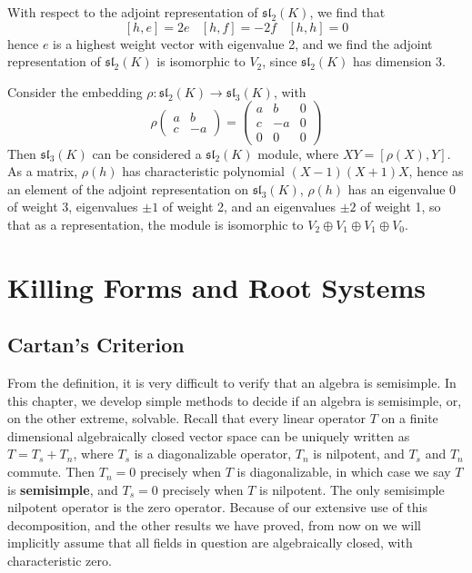 \begin{example}
    With respect to the adjoint representation of $\mathfrak{sl}_2(K)$, we find that
    \[ [h,e] = 2e\ \ \ \ [h,f] = -2f\ \ \ \ [h,h] = 0 \]
    hence $e$ is a highest weight vector with eigenvalue 2, and we find the adjoint representation of $\mathfrak{sl}_2(K)$ is isomorphic to $V_2$, since $\mathfrak{sl}_2(K)$ has dimension 3.
\end{example}

\begin{example}
    Consider the embedding $\rho: \mathfrak{sl}_2(K) \to \mathfrak{sl}_3(K)$, with
    \[ \rho \begin{pmatrix} a & b \\ c & -a \end{pmatrix} = \begin{pmatrix} a & b & 0 \\ c & -a & 0 \\ 0 & 0 & 0 \end{pmatrix} \]
    Then $\mathfrak{sl}_3(K)$ can be considered a $\mathfrak{sl}_2(K)$ module, where $XY = [\rho(X),Y]$. As a matrix, $\rho(h)$ has characteristic polynomial $(X - 1)(X + 1)X$, hence as an element of the adjoint representation on $\mathfrak{sl}_3(K)$, $\rho(h)$ has an eigenvalue 0 of weight 3, eigenvalues $\pm 1$ of weight 2, and an eigenvalues $\pm 2$ of weight 1, so that as a representation, the module is isomorphic to $V_2 \oplus V_1 \oplus V_1 \oplus V_0$.
\end{example}

\chapter{Killing Forms and Root Systems}

\section{Cartan's Criterion}

From the definition, it is very difficult to verify that an algebra is semisimple. In this chapter, we develop simple methods to decide if an algebra is semisimple, or, on the other extreme, solvable. Recall that every linear operator $T$ on a finite dimensional algebraically closed vector space can be uniquely written as $T = T_s + T_n$, where $T_s$ is a diagonalizable operator, $T_n$ is nilpotent, and $T_s$ and $T_n$ commute. Then $T_n = 0$ precisely when $T$ is diagonalizable, in which case we say $T$ is {\bf semisimple}, and $T_s = 0$ precisely when $T$ is nilpotent. The only semisimple nilpotent operator is the zero operator. Because of our extensive use of this decomposition, and the other results we have proved, from now on we will implicitly assume that all fields in question are algebraically closed, with characteristic zero.

